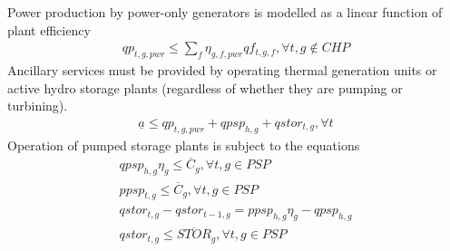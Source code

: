 \documentclass[11pt,a4paper]{article}
\begin{document}
Power production by power-only generators is modelled as a linear function of plant efficiency
\begin{align}
qp_{t,g,pwr} \leq \sum_{f} \eta_{g,f,pwr} qf_{t,g,f}, \forall t, g \notin CHP  
\end{align}
Ancillary services must be provided by operating thermal generation units or active hydro storage plants (regardless of whether they are pumping or turbining).
\begin{align}
\underline{a} \leq qp_{t,g,pwr} + qpsp_{h,g} + qstor_{t,g}, \forall t
\end{align}
Operation of pumped storage plants is subject to the equations
\begin{align}
qpsp_{h,g} \eta_{g} \leq \overline{C}_{g}, \forall t, g \in PSP \\
ppsp_{t,g} \leq \overline{C}_{g}, \forall t, g \in PSP \\
qstor_{t,g} - qstor_{t-1, g} = ppsp_{h,g} \eta_{g} - qpsp_{h,g} \\
qstor_{t,g} \leq \overline{STOR}_{g}, \forall t, g \in PSP
\end{align}
\end{document}

